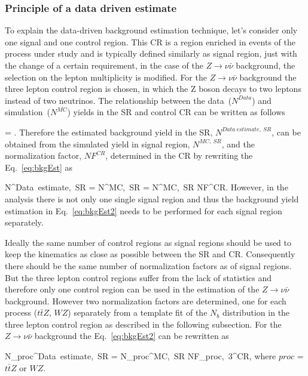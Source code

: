 \subsubsection{Principle of a data driven estimate}

To explain the data-driven background estimation technique, let's consider only one signal and one control region. This CR is a region enriched in events of the process under study and is typically defined similarly as signal region, just with the change of a certain requirement, in the case of the $Z \to \nu \bar{\nu}$ background, the selection on the lepton multiplicity is modified. For the $Z \to \nu \bar{\nu}$ background the three lepton control region is chosen, in which the Z boson decays to two leptons instead of two neutrinos. The relationship between the data~($N^{Data}$) and simulation~($N^{MC}$) yields in the SR and control CR can be written as follows

{
  = .
}
Therefore the estimated background yield in the SR, $N^{Data~estimate,~SR}$, can be obtained from the simulated yield in signal region, $N^{MC,~SR}$, and the normalization factor, $NF^{CR}$, determined in the CR by rewriting the Eq.~\ref{eq:bkgEst} as

{
N^{Data~estimate,~SR}  = N^{MC,~SR} \times  {} = N^{MC,~SR} \times  NF^{CR}.
}
However, in the analysis there is not only one single signal region and thus the background yield estimation in Eq.~\ref{eq:bkgEst2} needs to be performed for each signal region separately. 

Ideally the same number of control regions as signal regions should be used to keep the kinematics as close as possible between the SR and CR. Consequently there should be the same number of normalization factors as of signal regions.  But the three lepton control regions suffer from the lack of statistics and therefore  only one control region can be used in the estimation of the $Z \to \nu \bar{\nu}$ background. However two normalization factors are determined, one for each process ($t\bar{t}Z$, $WZ$) separately  from a template fit of the $N_{b}$ distribution in the three lepton control region as described in the following subsection. For the $Z \to \nu \bar{\nu}$ background the Eq.~\ref{eq:bkgEst2} can be rewritten as

{
N_{proc}^{Data~estimate,~SR}  = N_{proc}^{MC,~SR} \times NF_{proc,~3\ell}^{CR},
}
where $proc$ = $t\bar{t}Z$ or $WZ$.

